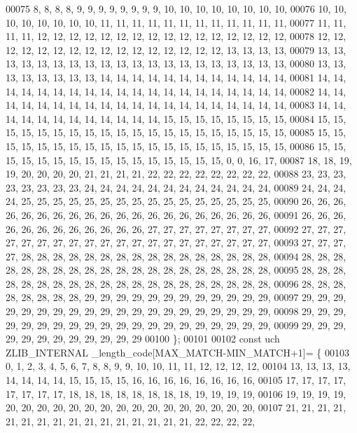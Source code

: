 \begin{DoxyCode}
00075  8,  8,  8,  8,  9,  9,  9,  9,  9,  9,  9,  9, 10, 10, 10, 10, 10, 10, 10, 10,
00076 10, 10, 10, 10, 10, 10, 10, 10, 11, 11, 11, 11, 11, 11, 11, 11, 11, 11, 11, 11,
00077 11, 11, 11, 11, 12, 12, 12, 12, 12, 12, 12, 12, 12, 12, 12, 12, 12, 12, 12, 12,
00078 12, 12, 12, 12, 12, 12, 12, 12, 12, 12, 12, 12, 12, 12, 12, 12, 13, 13, 13, 13,
00079 13, 13, 13, 13, 13, 13, 13, 13, 13, 13, 13, 13, 13, 13, 13, 13, 13, 13, 13, 13,
00080 13, 13, 13, 13, 13, 13, 13, 13, 14, 14, 14, 14, 14, 14, 14, 14, 14, 14, 14, 14,
00081 14, 14, 14, 14, 14, 14, 14, 14, 14, 14, 14, 14, 14, 14, 14, 14, 14, 14, 14, 14,
00082 14, 14, 14, 14, 14, 14, 14, 14, 14, 14, 14, 14, 14, 14, 14, 14, 14, 14, 14, 14,
00083 14, 14, 14, 14, 14, 14, 14, 14, 14, 14, 14, 14, 15, 15, 15, 15, 15, 15, 15, 15,
00084 15, 15, 15, 15, 15, 15, 15, 15, 15, 15, 15, 15, 15, 15, 15, 15, 15, 15, 15, 15,
00085 15, 15, 15, 15, 15, 15, 15, 15, 15, 15, 15, 15, 15, 15, 15, 15, 15, 15, 15, 15,
00086 15, 15, 15, 15, 15, 15, 15, 15, 15, 15, 15, 15, 15, 15, 15, 15,  0,  0, 16, 17,
00087 18, 18, 19, 19, 20, 20, 20, 20, 21, 21, 21, 21, 22, 22, 22, 22, 22, 22, 22, 22,
00088 23, 23, 23, 23, 23, 23, 23, 23, 24, 24, 24, 24, 24, 24, 24, 24, 24, 24, 24, 24,
00089 24, 24, 24, 24, 25, 25, 25, 25, 25, 25, 25, 25, 25, 25, 25, 25, 25, 25, 25, 25,
00090 26, 26, 26, 26, 26, 26, 26, 26, 26, 26, 26, 26, 26, 26, 26, 26, 26, 26, 26, 26,
00091 26, 26, 26, 26, 26, 26, 26, 26, 26, 26, 26, 26, 27, 27, 27, 27, 27, 27, 27, 27,
00092 27, 27, 27, 27, 27, 27, 27, 27, 27, 27, 27, 27, 27, 27, 27, 27, 27, 27, 27, 27,
00093 27, 27, 27, 27, 28, 28, 28, 28, 28, 28, 28, 28, 28, 28, 28, 28, 28, 28, 28, 28,
00094 28, 28, 28, 28, 28, 28, 28, 28, 28, 28, 28, 28, 28, 28, 28, 28, 28, 28, 28, 28,
00095 28, 28, 28, 28, 28, 28, 28, 28, 28, 28, 28, 28, 28, 28, 28, 28, 28, 28, 28, 28,
00096 28, 28, 28, 28, 28, 28, 28, 28, 29, 29, 29, 29, 29, 29, 29, 29, 29, 29, 29, 29,
00097 29, 29, 29, 29, 29, 29, 29, 29, 29, 29, 29, 29, 29, 29, 29, 29, 29, 29, 29, 29,
00098 29, 29, 29, 29, 29, 29, 29, 29, 29, 29, 29, 29, 29, 29, 29, 29, 29, 29, 29, 29,
00099 29, 29, 29, 29, 29, 29, 29, 29, 29, 29, 29, 29
00100 \};
00101 
00102 \textcolor{keyword}{const} uch ZLIB\_INTERNAL \_length\_code[MAX\_MATCH-MIN\_MATCH+1]= \{
00103  0,  1,  2,  3,  4,  5,  6,  7,  8,  8,  9,  9, 10, 10, 11, 11, 12, 12, 12, 12,
00104 13, 13, 13, 13, 14, 14, 14, 14, 15, 15, 15, 15, 16, 16, 16, 16, 16, 16, 16, 16,
00105 17, 17, 17, 17, 17, 17, 17, 17, 18, 18, 18, 18, 18, 18, 18, 18, 19, 19, 19, 19,
00106 19, 19, 19, 19, 20, 20, 20, 20, 20, 20, 20, 20, 20, 20, 20, 20, 20, 20, 20, 20,
00107 21, 21, 21, 21, 21, 21, 21, 21, 21, 21, 21, 21, 21, 21, 21, 21, 22, 22, 22, 22,

\end{DoxyCode}
